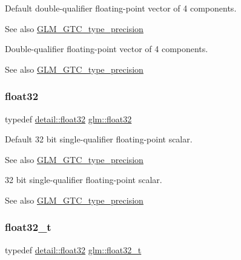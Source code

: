 Default double-\/qualifier floating-\/point vector of 4 components. \begin{DoxySeeAlso}{See also}
\mbox{\hyperlink{group__gtc__type__precision}{G\+L\+M\+\_\+\+G\+T\+C\+\_\+type\+\_\+precision}}
\end{DoxySeeAlso}
Double-\/qualifier floating-\/point vector of 4 components. \begin{DoxySeeAlso}{See also}
\mbox{\hyperlink{group__gtc__type__precision}{G\+L\+M\+\_\+\+G\+T\+C\+\_\+type\+\_\+precision}} 
\end{DoxySeeAlso}
\mbox{\label{group__gtc__type__precision_ga814f2f65354b6588b067cc5c67a6b340}} 
\subsubsection{\texorpdfstring{float32}{float32}}
{\footnotesize\ttfamily typedef \mbox{\hyperlink{namespaceglm_1_1detail_ad60558c5c304624de0b54c51b5857737}{detail\+::float32}} \mbox{\hyperlink{group__gtc__type__precision_ga814f2f65354b6588b067cc5c67a6b340}{glm\+::float32}}}

Default 32 bit single-\/qualifier floating-\/point scalar. \begin{DoxySeeAlso}{See also}
\mbox{\hyperlink{group__gtc__type__precision}{G\+L\+M\+\_\+\+G\+T\+C\+\_\+type\+\_\+precision}}
\end{DoxySeeAlso}
32 bit single-\/qualifier floating-\/point scalar. \begin{DoxySeeAlso}{See also}
\mbox{\hyperlink{group__gtc__type__precision}{G\+L\+M\+\_\+\+G\+T\+C\+\_\+type\+\_\+precision}} 
\end{DoxySeeAlso}
\mbox{\label{group__gtc__type__precision_ga642737ae3e7c434b366f2191e6944bf2}} 
\subsubsection{\texorpdfstring{float32\+\_\+t}{float32\_t}}
{\footnotesize\ttfamily typedef \mbox{\hyperlink{namespaceglm_1_1detail_ad60558c5c304624de0b54c51b5857737}{detail\+::float32}} \mbox{\hyperlink{group__gtc__type__precision_ga642737ae3e7c434b366f2191e6944bf2}{glm\+::float32\+\_\+t}}}

